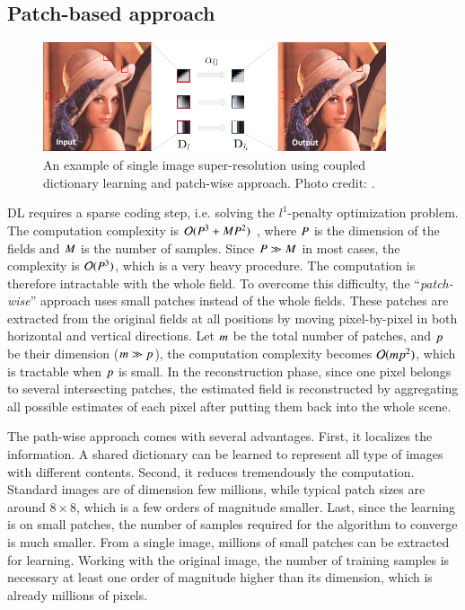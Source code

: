 \subsection{Patch-based approach}
\label{subsec:patch_based_estimation}
\begin{figure}
\centering
	\includegraphics[width=0.9\textwidth]{./images/DL/ScSR.png}
	\caption{\label{fig:ScSR} An example of single image super-resolution using coupled dictionary learning and patch-wise approach. Photo credit: \citet{yang2010image}.}
\end{figure}

DL requires a sparse coding step, i.e. solving the $ l^1 $-penalty optimization problem. The computation complexity is $ \mathcal{O}(P^3+MP^2) $ \citep{efron2004least}, where $ P $ is the dimension of the fields and $ M $ is the number of samples. Since $ P \gg M$ in most cases, the complexity is $ \mathcal{O}(P^3) $, which is a very heavy procedure. The computation is therefore intractable with the whole field. To overcome this difficulty, the ``\textit{patch-wise}'' approach uses small patches instead of the whole fields. These patches are extracted from the original fields at all positions by moving pixel-by-pixel in both horizontal and vertical directions. Let $ m $ be the total number of patches, and $ p $ be their dimension ($m \gg p $), the computation complexity becomes $ \mathcal{O}(mp^2) $, which is tractable when $ p $ is small. In the reconstruction phase, since one pixel belongs to several intersecting patches, the estimated field is reconstructed by aggregating all possible estimates of each pixel after putting them back into the whole scene.

The path-wise approach comes with several advantages. First, it localizes the information. A shared dictionary can be learned to represent all type of images with different contents. Second, it reduces tremendously the computation. Standard images are of dimension few millions, while typical patch sizes are around $ 8 \times 8 $, which is a few orders of magnitude smaller. Last, since the learning is on small patches, the number of samples required for the algorithm to converge is much smaller. From a single image, millions of small patches can be extracted for learning. Working with the original image, the number of training samples is necessary at least one order of magnitude higher than its dimension, which is already millions of pixels. 

